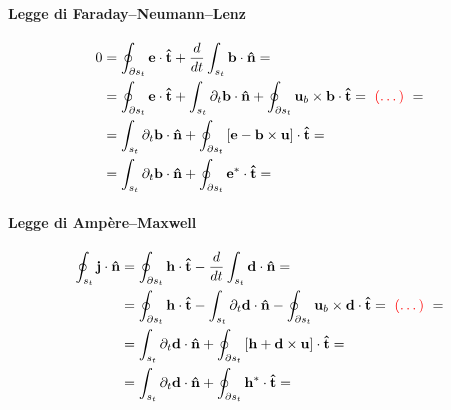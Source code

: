 \paragraph{Legge di Faraday--Neumann--Lenz}
\begin{equation}
\begin{aligned}
    0 & = \oint_{\partial s_t} \mathbf{e} \cdot \mathbf{\hat{t}} + \dfrac{d}{dt} \int_{s_t} \mathbf{b} \cdot \mathbf{\hat{n}} = \\
      & = \oint_{\partial s_t} \mathbf{e} \cdot \mathbf{\hat{t}} + \int_{s_t} \partial_t \mathbf{b} \cdot \mathbf{\hat{n}} + \oint_{\partial s_t} \mathbf{u}_b \times \mathbf{b} \cdot \mathbf{\hat{t}} = \ \text{{\color{red}(\dots)}} \ = \\ 
      & = \int_{s_t} \partial_t \mathbf{b} \cdot \mathbf{\hat{n}} + \oint_{\partial s_t} \left[ \mathbf{e} - \mathbf{b} \times \mathbf{u} \right] \cdot \mathbf{\hat{t}} = \\
      & = \int_{s_t} \partial_t \mathbf{b} \cdot \mathbf{\hat{n}} + \oint_{\partial s_t} \mathbf{e}^* \cdot \mathbf{\hat{t}} = \\
\end{aligned}
\end{equation}

\paragraph{Legge di Ampère--Maxwell}
\begin{equation}
\begin{aligned}
    \oint_{s_t} \mathbf{j} \cdot \mathbf{\hat{n}} & = \oint_{\partial s_t} \mathbf{h} \cdot \mathbf{\hat{t}} - \dfrac{d}{dt} \int_{s_t} \mathbf{d} \cdot \mathbf{\hat{n}} = \\
      & = \oint_{\partial s_t} \mathbf{h} \cdot \mathbf{\hat{t}} - \int_{s_t} \partial_t \mathbf{d} \cdot \mathbf{\hat{n}} - \oint_{\partial s_t} \mathbf{u}_b \times \mathbf{d} \cdot \mathbf{\hat{t}} = \ \text{{\color{red}(\dots)}} \ = \\ 
      & = \int_{s_t} \partial_t \mathbf{d} \cdot \mathbf{\hat{n}} + \oint_{\partial s_t} \left[ \mathbf{h} + \mathbf{d} \times \mathbf{u} \right] \cdot \mathbf{\hat{t}} = \\
      & = \int_{s_t} \partial_t \mathbf{d} \cdot \mathbf{\hat{n}} + \oint_{\partial s_t} \mathbf{h}^* \cdot \mathbf{\hat{t}} = \\
\end{aligned}
\end{equation}




